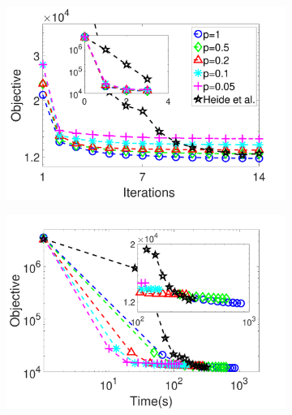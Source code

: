 \begin{figure}[h]
\centering
\begin{subfigure}{0.5\textwidth}
  \includegraphics[width=1\linewidth]{figure/iteVSobj.pdf}
\end{subfigure}

\begin{subfigure}{0.5\textwidth}
  \includegraphics[width=1\linewidth]{figure/timeVSobj.pdf}
  \vspace*{1mm}
\end{subfigure}


\end{figure}
